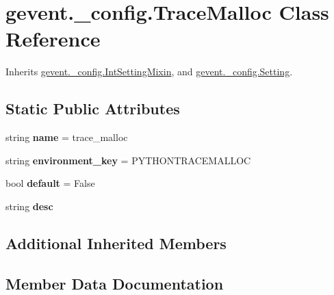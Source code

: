 \hypertarget{classgevent_1_1__config_1_1_trace_malloc}{}\section{gevent.\+\_\+config.\+Trace\+Malloc Class Reference}
\label{classgevent_1_1__config_1_1_trace_malloc}


Inherits \hyperlink{classgevent_1_1__config_1_1_int_setting_mixin}{gevent.\+\_\+config.\+Int\+Setting\+Mixin}, and \hyperlink{classgevent_1_1__config_1_1_setting}{gevent.\+\_\+config.\+Setting}.

\subsection*{Static Public Attributes}
\begin{DoxyCompactItemize}
\item 
\mbox{\label{classgevent_1_1__config_1_1_trace_malloc_aee2f8b24543c8824092929e45fb21039}} 
string {\bfseries name} = \textquotesingle{}trace\+\_\+malloc\textquotesingle{}
\item 
\mbox{\label{classgevent_1_1__config_1_1_trace_malloc_ab19a1e079d22ea073e8b65194870602c}} 
string {\bfseries environment\+\_\+key} = \textquotesingle{}P\+Y\+T\+H\+O\+N\+T\+R\+A\+C\+E\+M\+A\+L\+L\+OC\textquotesingle{}
\item 
\mbox{\label{classgevent_1_1__config_1_1_trace_malloc_a92cb26d22f5401b08b0625eb35edbd23}} 
bool {\bfseries default} = False
\item 
string {\bfseries desc}
\end{DoxyCompactItemize}
\subsection*{Additional Inherited Members}


\subsection{Member Data Documentation}
\mbox{\label{classgevent_1_1__config_1_1_trace_malloc_ad7b653308d049bfdb32abb66a5e92b34}} 
